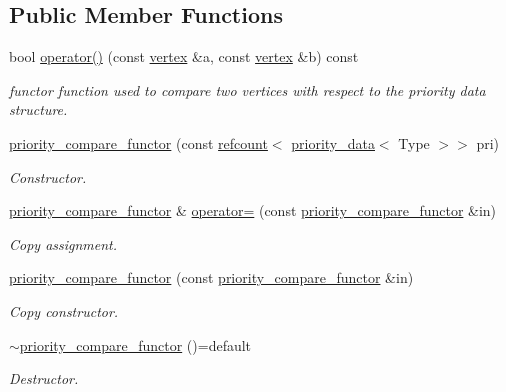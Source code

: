 \subsection*{Public Member Functions}
\begin{DoxyCompactItemize}
\item 
bool \hyperlink{structpriority__compare__functor_a3dc526546e2a327dcd3c531a57000802}{operator()} (const \hyperlink{graph_8hpp_abefdcf0544e601805af44eca032cca14}{vertex} \&a, const \hyperlink{graph_8hpp_abefdcf0544e601805af44eca032cca14}{vertex} \&b) const
\begin{DoxyCompactList}\small\item\em functor function used to compare two vertices with respect to the priority data structure. \end{DoxyCompactList}\item 
\hyperlink{structpriority__compare__functor_a3fe538f6182d30aafa148bcf5b3f9c57}{priority\+\_\+compare\+\_\+functor} (const \hyperlink{structrefcount}{refcount}$<$ \hyperlink{structpriority__data}{priority\+\_\+data}$<$ Type $>$$>$ pri)
\begin{DoxyCompactList}\small\item\em Constructor. \end{DoxyCompactList}\item 
\hyperlink{structpriority__compare__functor}{priority\+\_\+compare\+\_\+functor} \& \hyperlink{structpriority__compare__functor_a8ba10e1a3c85352aa5333633d555cb25}{operator=} (const \hyperlink{structpriority__compare__functor}{priority\+\_\+compare\+\_\+functor} \&in)
\begin{DoxyCompactList}\small\item\em Copy assignment. \end{DoxyCompactList}\item 
\hyperlink{structpriority__compare__functor_aa2d7c2fe4e4be53431af5992088285b9}{priority\+\_\+compare\+\_\+functor} (const \hyperlink{structpriority__compare__functor}{priority\+\_\+compare\+\_\+functor} \&in)
\begin{DoxyCompactList}\small\item\em Copy constructor. \end{DoxyCompactList}\item 
\hyperlink{structpriority__compare__functor_a9410926dd790146cbb589a0b307cf7bc}{$\sim$priority\+\_\+compare\+\_\+functor} ()=default
\begin{DoxyCompactList}\small\item\em Destructor. \end{DoxyCompactList}\end{DoxyCompactItemize}
